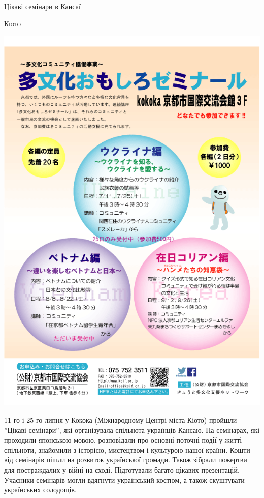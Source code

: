 \documentclass[10pt,a4paper]{article}
\newcommand{\NewsItem}[1]{%
		\usefont{T2A}{iwona}{m}{n} 
		\large #1 \vspace{4pt}
		\par \normalsize \normalfont}
\newcommand{\NewsAuthor}[1]{%
			\hfill \textsc{#1} \vspace{4pt}
			\par \normalfont}
\begin{document}
\begin{multicols}{3}
\vspace{1cm}
\NewsItem{Цікаві семінари в Кансаї}
\NewsAuthor{Кіото}
		\begin{center}
			\includegraphics[width=0.8\linewidth]{images/seminary}
		\end{center}
11-го і 25-го липня у Кокока (Міжнародному Центрі міста Кіото) пройшли ''Цікаві семінари'', які організувала спільнота українців Кансаю. На семінарах, які проходили японською мовою, розповідали про основні поточні події у житті спільноти, знайомили з історією, мистецтвом і культурою нашої країни. Кошти від семінарів пішли на розвиток української громади. Також зібрали пожертви для постраждалих у війні на сході. Підготували багато цікавих презентацій. Учасники семінарів могли вдягнути український костюм, а також скуштувати українських солодощів.

\end{multicols}

\newpage
\end{document}
